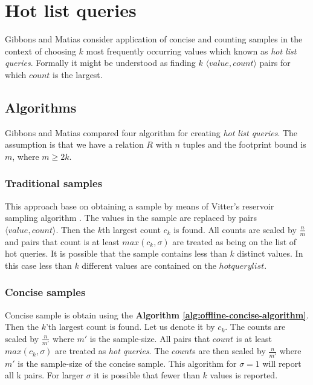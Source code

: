 \section{Hot list queries}
Gibbons and Matias consider application of concise and counting
samples in the context of choosing $k$ most frequently occurring
values which known as \textit{hot list queries}. Formally it might be
understood as finding $k$ $\langle value, count \rangle$ pairs for
which $count$ is the largest.

\subsection{Algorithms}
Gibbons and Matias \cite{GM98} compared four algorithm for creating
\textit{hot list queries}. The assumption is that we have a relation
$R$ with $n$ tuples and the footprint bound is $m$, where $m \geq 2k$.

\subsubsection{Traditional samples}
This approach base on obtaining a sample by means of Vitter's reservoir sampling algorithm
\cite{Vit85}. The values in the sample are replaced by pairs $\langle
value, count \rangle$. Then the $k$th largest count $c_k$ is
found. All counts are scaled by $\frac{n}{m}$ and pairs that count is
at least $max(c_k, \sigma)$ are treated as being on the list of hot
queries. It is possible that the sample contains less than $k$
distinct values. In this case less than $k$ different values are
contained on the $hot query list$.



\subsubsection{Concise samples}
Concise sample is obtain using the \textbf{Algorithm
  \ref{alg:offline-concise-algorithm}}.
Then the $k$'th largest count is found. Let us denote it by
$c_k$. The counts are scaled by $\frac{n}{m'}$ where $m'$ is the
sample-size. All pairs that $count$ is at least $max(c_k, \sigma)$ are
treated as \textit{hot queries}. The $count$s are then scaled by $\frac{n}{m'}$ where $m'$
is the sample-size of the concise sample. This algorithm for
$\sigma = 1$ will report all k pairs. For larger $\sigma$ it is
possible that fewer than $k$ values is reported.

